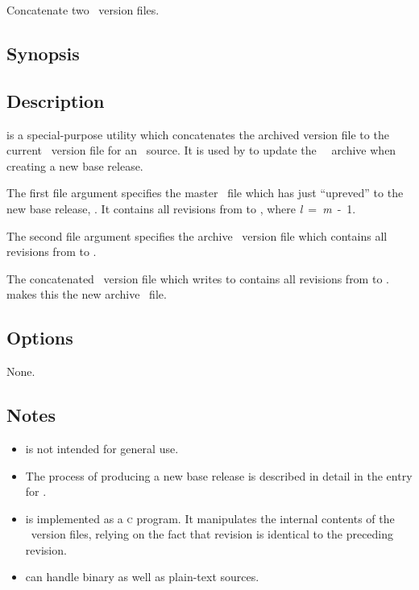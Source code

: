 Concatenate two \rcs\ version files.

\subsection*{Synopsis}
 
\begin{synopsis}
\end{synopsis}
 
\subsection*{Description}
 
 is a special-purpose utility which concatenates the archived \rcs
version file to the current \rcs\ version file for an \aipspp\ source.  It is
used by  to update the \aipspp\ \rcs\ archive when creating a
new base release.

The first file argument specifies the master \rcs\ file which 
has just ``upreved'' to the new base release, .  It
contains all revisions from  to ,
where \textit{l}~=~\textit{m}~-~1.

The second file argument specifies the archive \rcs\ version file which
contains all revisions from  to .  

The concatenated \rcs\ version file which  writes to 
contains all revisions from  to .
 makes this the new archive \rcs\ file.
 
\subsection*{Options}
 
None.

\subsection*{Notes}
 
\begin{itemize}
\item
    is not intended for general use.

\item
   The process of producing a new base release is described in detail in the
   entry for .

\item
    is implemented as a \textsc{c} program.  It manipulates the
   internal contents of the \rcs\ version files, relying on the fact that
   revision  is identical to the preceding revision.

\item
    can handle binary as well as plain-text sources.
\end{itemize}

